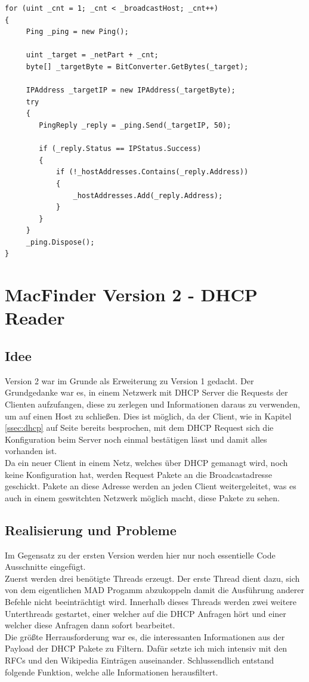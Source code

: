 \documentclass[12pt,a4paper]{report}
\begin{document}
\begin{onehalfspace}
\begin{lstlisting}
for (uint _cnt = 1; _cnt < _broadcastHost; _cnt++)
{
     Ping _ping = new Ping();

     uint _target = _netPart + _cnt;
     byte[] _targetByte = BitConverter.GetBytes(_target);

     IPAddress _targetIP = new IPAddress(_targetByte);
     try
     {
     	PingReply _reply = _ping.Send(_targetIP, 50);
	 	
	 	if (_reply.Status == IPStatus.Success)
     	{
     		if (!_hostAddresses.Contains(_reply.Address))
     		{
     			_hostAddresses.Add(_reply.Address);
	 		}
     	}
     }
     _ping.Dispose();
}
\end{lstlisting}

\section{MacFinder Version 2 - DHCP Reader}
\subsection{Idee}
Version 2 war im Grunde als Erweiterung zu Version 1 gedacht. Der Grundgedanke war es, in einem Netzwerk mit DHCP Server die Requests der Clienten aufzufangen, diese zu zerlegen und Informationen daraus zu verwenden, um auf einen Host zu schließen. Dies ist möglich, da der Client, wie in Kapitel \ref{ssec:dhcp} auf Seite \pageref{ssec:dhcp} bereits besprochen, mit dem DHCP Request sich die Konfiguration beim Server noch einmal bestätigen lässt und damit alles vorhanden ist.\\
Da ein neuer Client in einem Netz, welches über DHCP gemanagt wird, noch keine Konfiguration hat, werden Request Pakete an die Broadcastadresse geschickt. Pakete an diese Adresse werden an jeden Client weitergeleitet, was es auch in einem geswitchten Netzwerk möglich macht, diese Pakete zu sehen.\\

\subsection{Realisierung und Probleme}
Im Gegensatz zu der ersten Version werden hier nur noch essentielle Code Ausschnitte eingefügt.\\
Zuerst werden drei benötigte Threads erzeugt. Der erste Thread dient dazu, sich von dem eigentlichen MAD Progamm abzukoppeln damit die Ausführung anderer Befehle nicht beeinträchtigt wird. Innerhalb dieses Threads werden zwei weitere Unterthreads gestartet, einer welcher auf die DHCP Anfragen hört und einer welcher diese Anfragen dann sofort bearbeitet.\\
Die größte Herrausforderung war es, die interessanten Informationen aus der Payload der DHCP Pakete zu Filtern. Dafür setzte ich mich intensiv mit den RFCs und den Wikipedia Einträgen auseinander. Schlussendlich entstand folgende Funktion, welche alle Informationen herausfiltert.


\end{onehalfspace}
\end{document}
